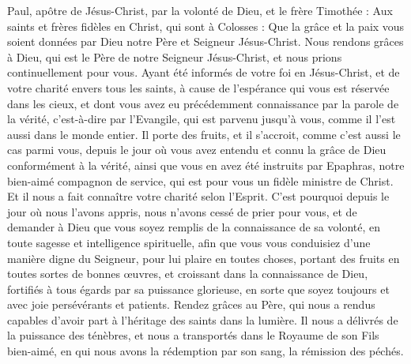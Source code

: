 \begin{multicols}{2}
\TextTitle{[Introduction]}
\VerseOne{}Paul, apôtre de Jésus-Christ, par la volonté de Dieu, et le frère Timothée :
Aux saints et frères fidèles en Christ, qui sont à Colosses : Que la grâce et la paix vous soient données par Dieu notre Père et Seigneur Jésus-Christ.
Nous rendons grâces à Dieu, qui est le Père de notre Seigneur Jésus-Christ, et nous prions continuellement pour vous.
Ayant été informés de votre foi en Jésus-Christ, et de votre charité envers tous les saints,
à cause de l'espérance qui vous est réservée dans les cieux, et dont vous avez eu précédemment connaissance par la parole de la vérité, c'est-à-dire par l'Evangile,
qui est parvenu jusqu'à vous, comme il l'est aussi dans le monde entier. Il porte des fruits, et il s’accroit, comme c’est aussi le cas parmi vous, depuis le jour où vous avez entendu et connu la grâce de Dieu conformément à la vérité,
ainsi que vous en avez été instruits par Epaphras, notre bien-aimé compagnon de service, qui est pour vous un fidèle ministre de Christ.
Et il nous a fait connaître votre charité selon l’Esprit.
C'est pourquoi depuis le jour où nous l’avons appris, nous n’avons cessé de prier pour vous, et de demander à Dieu que vous soyez remplis de la connaissance de sa volonté, en toute sagesse et intelligence spirituelle,
afin que vous vous conduisiez d’une manière digne du Seigneur, pour lui plaire en toutes choses, portant des fruits en toutes sortes de bonnes œuvres, et croissant dans la connaissance de Dieu,
fortifiés à tous égards par sa puissance glorieuse, en sorte que soyez toujours et avec joie persévérants et patients.
Rendez grâces au Père, qui nous a rendus capables d’avoir part à l'héritage des saints dans la lumière.
Il nous a délivrés de la puissance des ténèbres, et nous a transportés dans le Royaume de son Fils bien-aimé,
en qui nous avons la rédemption par son sang, la rémission des péchés.

\end{multicols}
